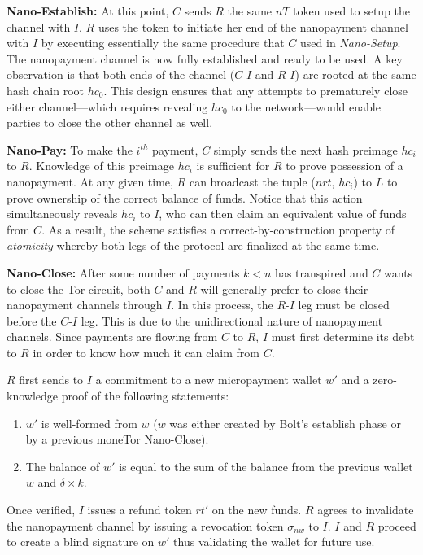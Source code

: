 \medskip \noindent\textbf{Nano-Establish:} At this point, $C$ sends $R$ the same $nT$ token used to setup the channel with $I$.
$R$ uses the token to initiate her end of the nanopayment channel with $I$ by executing essentially the same procedure that $C$ used in \emph{Nano-Setup}.
The nanopayment channel is now fully established and ready to be used.
A key observation is that both ends of the channel ($C$-$I$ and $R$-$I$) are rooted at the same hash chain root $hc_0$.
This design ensures that any attempts to prematurely close either channel---which requires revealing $hc_0$ to the network---would enable parties to close the other channel as well.

\medskip \noindent\textbf{Nano-Pay:} To make the $i^{th}$ payment, $C$ simply sends the next hash preimage $hc_i$ to $R$.
Knowledge of this preimage $hc_i$ is sufficient for $R$ to prove possession of a nanopayment.
At any given time, $R$ can broadcast the tuple ($nrt$, $hc_i$) to $L$ to prove ownership of the correct balance of funds.
Notice that this action simultaneously reveals $hc_i$ to $I$, who can then claim an equivalent value of funds from $C$.
As a result, the scheme satisfies a correct-by-construction property of \emph{atomicity} whereby both legs of the protocol are finalized at the same time.

\medskip \noindent\textbf{Nano-Close:} After some number of payments $k < n$ has transpired and $C$ wants to close the Tor circuit, both $C$ and $R$ will generally prefer to close their nanopayment channels through $I$.
In this process, the $R$-$I$ leg must be closed before the $C$-$I$ leg.
This is due to the unidirectional nature of nanopayment channels.
Since payments are flowing from $C$ to $R$, $I$ must first determine its debt to $R$ in order to know how much it can claim from $C$.

$R$ first sends to $I$ a commitment to a new micropayment wallet $w'$ and a zero-knowledge proof of the following statements:

\begin{enumerate}
\item $w'$ is well-formed from $w$ ($w$ was either created by Bolt's establish phase or by a previous moneTor Nano-Close).
\item The balance of $w'$ is equal to the sum of the balance from the previous wallet $w$ and $\delta \times k$.
\end{enumerate}

Once verified, $I$ issues a refund token $rt'$ on the new funds.
$R$ agrees to invalidate the nanopayment channel by issuing a revocation token $\sigma_{nw}$ to $I$.
$I$ and $R$ proceed to create a blind signature on $w'$ thus validating the wallet for future use.

